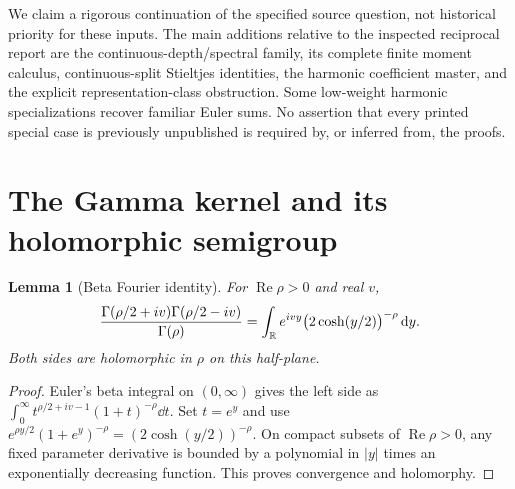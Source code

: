 \documentclass[11pt,letterpaper]{article}
\numberwithin{equation}{section}
\newtheorem{lemma}[theorem]{Lemma}
\theoremstyle{definition}\newtheorem{definition}[theorem]{Definition}
\theoremstyle{remark}\newtheorem{remark}[theorem]{Remark}
\newcommand{\Rea}{\operatorname{Re}}\newcommand{\Ima}{\operatorname{Im}}
\begin{document}
We claim a rigorous continuation of the specified source question, not
historical priority for these inputs. The main additions relative to the
inspected reciprocal report are the continuous-depth/spectral family,
its complete finite moment calculus, continuous-split Stieltjes identities,
the harmonic coefficient master, and the explicit representation-class
obstruction. Some low-weight harmonic specializations recover familiar
Euler sums. No assertion that every printed special case is previously
unpublished is required by, or inferred from, the proofs.

\section{The Gamma kernel and its holomorphic semigroup}
\label{cdl:sec:kernel}

\begin{lemma}[Beta Fourier identity]\label{cdl:lem:beta}
For $\Rea\rho>0$ and real $v$,
\begin{equation}\label{cdl:eq:betaFT}
 \frac{\Gamma(\rho/2+iv)\Gamma(\rho/2-iv)}{\Gamma(\rho)}
 =\int_\mathbb R e^{ivy}\bigl(2\cosh(y/2)\bigr)^{-\rho}\,\mathrm d y.
\end{equation}
Both sides are holomorphic in $\rho$ on this half-plane.
\end{lemma}
\begin{proof}
Euler's beta integral on $(0,\infty)$ gives the left side as
$\int_0^\infty t^{\rho/2+iv-1}(1+t)^{-\rho}\dd t$.
Set $t=e^y$ and use
$e^{\rho y/2}(1+e^y)^{-\rho}=(2\cosh(y/2))^{-\rho}$.
On compact subsets of $\Rea\rho>0$, any fixed parameter derivative is
bounded by a polynomial in $|y|$ times an exponentially decreasing
function. This proves convergence and holomorphy.
\end{proof}
\end{document}
